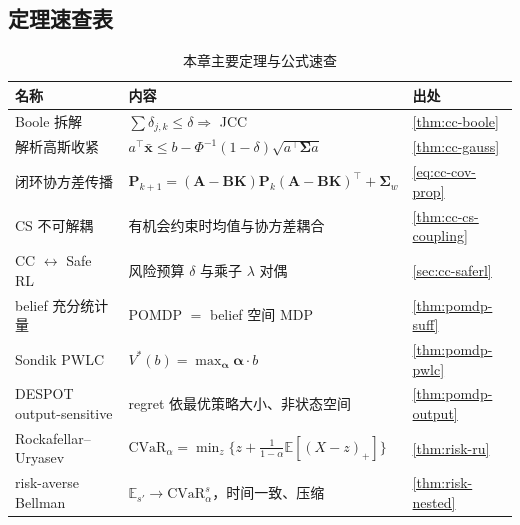\subsection*{定理速查表}
\begin{table}[H]\centering\small
\caption{本章主要定理与公式速查}
\label{tab:plan-chance-thm}
\begin{tabular}{lll}
\toprule
名称 & 内容 & 出处 \\
\midrule
Boole 拆解 & $\sum\delta_{j,k}\le\delta\Rightarrow$ JCC & \cref{thm:cc-boole} \\
解析高斯收紧 & $a^\top\bar{\mathbf{x}}\le b-\Phi^{-1}(1-\delta)\sqrt{a^\top\boldsymbol{\Sigma}a}$ & \cref{thm:cc-gauss} \\
闭环协方差传播 & $\mathbf{P}_{k+1}=(\mathbf{A}-\mathbf{B}\mathbf{K})\mathbf{P}_k(\mathbf{A}-\mathbf{B}\mathbf{K})^\top+\boldsymbol{\Sigma}_w$ & \cref{eq:cc-cov-prop} \\
CS 不可解耦 & 有机会约束时均值与协方差耦合 & \cref{thm:cc-cs-coupling} \\
CC $\leftrightarrow$ Safe RL & 风险预算 $\delta$ 与乘子 $\lambda$ 对偶 & \cref{sec:cc-saferl} \\
belief 充分统计量 & POMDP $=$ belief 空间 MDP & \cref{thm:pomdp-suff} \\
Sondik PWLC & $V^*(b)=\max_{\boldsymbol{\alpha}}\boldsymbol{\alpha}\cdot b$ & \cref{thm:pomdp-pwlc} \\
DESPOT output-sensitive & regret 依最优策略大小、非状态空间 & \cref{thm:pomdp-output} \\
Rockafellar--Uryasev & $\mathrm{CVaR}_\alpha=\min_z\{z+\frac{1}{1-\alpha}\mathbb{E}[(X-z)_+]\}$ & \cref{thm:risk-ru} \\
risk-averse Bellman & $\mathbb{E}_{s'}\to\mathrm{CVaR}_\alpha^s$，时间一致、压缩 & \cref{thm:risk-nested} \\
\bottomrule
\end{tabular}
\end{table}

